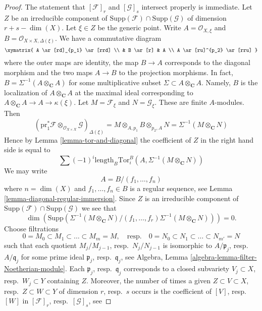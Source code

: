 \begin{proof}
The statement that $[\mathcal{F}]_r$ and $[\mathcal{G}]_s$ intersect properly
is immediate. Let $Z$ be an irreducible component of
$\text{Supp}(\mathcal{F}) \cap \text{Supp}(\mathcal{G})$ of dimension
$r + s - \dim(X)$. Let $\xi \in Z$ be the generic point.
Write $A = \mathcal{O}_{X, \xi}$ and
$B = \mathcal{O}_{X \times X, \Delta(\xi)}$. We have a commutative diagram
$$
\xymatrix{
A \ar[rd]_{p_1} \ar[rrd] \\
& B \ar[r] & A \\
A \ar[ru]^{p_2} \ar[rru]
}
$$
where the outer maps are identity, the map $B \to A$ corresponds to the
diagonal morphism and the two maps $A \to B$ to the projection morphisms.
In fact, $B = \Sigma^{-1}(A \otimes_\mathbf{C} A)$ for some multiplicative
subset $\Sigma \subset A \otimes_\mathbf{C} A$. Namely, $B$ is the
localization of $A \otimes_\mathbf{C} A$ at the maximal ideal corresponding
to $A \otimes_\mathbf{C} A \to A \to \kappa(\xi)$.
Let $M = \mathcal{F}_\xi$ and $N = \mathcal{G}_\xi$.
These are finite $A$-modules. Then
$$
\left(\text{pr}_1^*\mathcal{F}
\otimes_{\mathcal{O}_{X \times X}} \mathcal{G}\right)_{\Delta(\xi)} =
M \otimes_{A, p_1} B \otimes_{p_2, A} N =
\Sigma^{-1}(M \otimes_\mathbf{C} N)
$$
Hence by Lemma \ref{lemma-tor-and-diagonal}
the coefficient of $Z$ in the right hand side is equal to
$$
\sum (-1)^i
\text{length}_B \text{Tor}_i^B(A, \Sigma^{-1}(M \otimes_\mathbf{C} N))
$$
We may write
$$
A = B/(f_1, \ldots, f_n)
$$
where $n = \dim(X)$ and $f_1, \ldots, f_n \in B$ is a regular sequence, see
Lemma \ref{lemma-diagonal-regular-immersion}. Since $Z$ is an irreducible
component of $\text{Supp}(\mathcal{F}) \cap \text{Supp}(\mathcal{G})$
we see that
$$
\dim\left(
\text{Supp}\left(
\Sigma^{-1}(M \otimes_\mathbf{C} N)/
(f_1, \ldots, f_r)\Sigma^{-1}(M \otimes_\mathbf{C} N)
\right)\right)
= 0.
$$
Choose filtrations
$$
0 = M_0 \subset M_1 \subset \ldots \subset M_m = M,
\quad\text{resp.}\quad
0 = N_0 \subset N_1 \subset \ldots \subset N_{m'} = N$$
such that each quotient $M_j/M_{j - 1}$, resp.\ $N_j/N_{j - 1}$
is isomorphic to $A/\mathfrak p_j$, resp.\ $A/\mathfrak q_j$
for some prime ideal $\mathfrak p_j$, resp.\ $\mathfrak q_j$, see
Algebra, Lemma \ref{algebra-lemma-filter-Noetherian-module}.
Each $\mathfrak p_j$, resp.\ $\mathfrak q_j$ corresponds to a
closed subvariety $V_j \subset X$, resp.\ $W_j \subset Y$
containing $Z$. Moreover, the number of times a given
$Z \subset V \subset X$, resp.\ $Z \subset W \subset Y$
of dimension $r$, resp.\ $s$ occurs is the coefficient of
$[V]$, resp.\ $[W]$ in $[\mathcal{F}]_r$, resp.\ $[\mathcal{G}]_s$, see

\end{proof}
